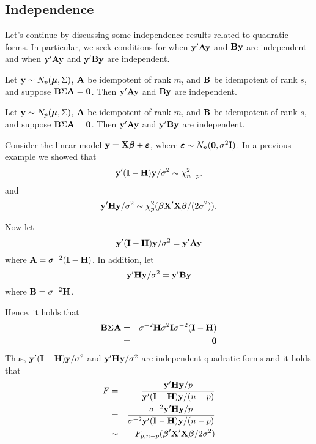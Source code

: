 \subsection{Independence}
 
Let's continue by discussing some independence results related to quadratic forms.
In particular, we seek conditions for when $\mathbf{y}' \mathbf{A} \mathbf{y}$ and $\mathbf{B} \mathbf{y}$ are independent and when $\mathbf{y}' \mathbf{A} \mathbf{y}$ and $\mathbf{y}' \mathbf{B} \mathbf{y}$ are independent.

 

\bstheo
Let $\mathbf{y} \sim N_p(\mbox{\boldmath $\mu$}, \Sigma)$, $\mathbf{A}$ be idempotent of rank $m$, and $\mathbf{B}$ be idempotent of rank $s$, and suppose $\mathbf{B} \Sigma \mathbf{A} = \mathbf{0}$. Then $\mathbf{y}' \mathbf{A} \mathbf{y}$ and $\mathbf{B} \mathbf{y}$ are independent.
\estheo


\bstheo
Let $\mathbf{y} \sim N_p(\mbox{\boldmath $\mu$}, \Sigma)$, $\mathbf{A}$ be idempotent of rank $m$, and $\mathbf{B}$ be idempotent of rank $s$, and suppose $\mathbf{B} \Sigma \mathbf{A} = \mathbf{0}$. Then $\mathbf{y}' \mathbf{A} \mathbf{y}$ and $\mathbf{y}' \mathbf{B} \mathbf{y}$ are independent.
\estheo


\vb
\bexa
Consider the linear model $\mathbf{y=X\mbox{\boldmath $\beta$} + \mbox{\boldmath $\varepsilon$}}$, where $\mbox{\boldmath $\varepsilon$} \sim N_n(\mathbf{0}, \sigma^2 \mathbf{I})$. 
In a previous example we showed that
$$
\mathbf{y}' (\mathbf{I} - \mathbf{H}) \mathbf{y}/\sigma^2 \sim \chi^2_{n-p}.
$$
and
$$
\mathbf{y}' \mathbf{H} \mathbf{y} /\sigma^2\sim \chi^2_p(\mbox{\boldmath $\beta$} \mathbf{X}' \mathbf{X} \mbox{\boldmath $\beta$}/ (2 \sigma^2)).
$$

Now let
$$
\mathbf{y}' (\mathbf{I} - \mathbf{H}) \mathbf{y}/\sigma^2 = \mathbf{y}' \mathbf{A} \mathbf{y}
$$
where $\mathbf{A} = \sigma^{-2}(\mathbf{I} - \mathbf{H})$.
In addition, let
$$
\mathbf{y}' \mathbf{H} \mathbf{y}/\sigma^2 = \mathbf{y}' \mathbf{B} \mathbf{y} 
$$
where $\mathbf{B} = \sigma^{-2} \mathbf{H}$.

Hence, it holds that
\begin{eqnarray*}
\mathbf{B} \Sigma \mathbf{A}  &=& \sigma^{-2} \mathbf{H}  \sigma^2 \mathbf{I} \sigma^{-2}(\mathbf{I} - \mathbf{H})\\
&=& \mathbf{0}
\end{eqnarray*}
Thus, $\mathbf{y}' (\mathbf{I} - \mathbf{H}) \mathbf{y}/\sigma^2$ and $\mathbf{y}' \mathbf{H} \mathbf{y}/\sigma^2$ are independent quadratic forms and it holds that
\begin{eqnarray*}
F &=& \frac{\bfy' \bfH \bfy/p}{\bfy' (\bfI - \bfH) \bfy/(n-p)} \\
\vb
&=& \frac{\sigma^{-2}\bfy' \bfH \bfy/p}{\sigma^{-2}\bfy' (\bfI - \bfH) \bfy/(n-p)} \\
\vb
& \sim& F_{p, n-p}(\bfbet' \bfX' \bfX \bfbet/{2\sigma^2})
\end{eqnarray*}

\eexa



